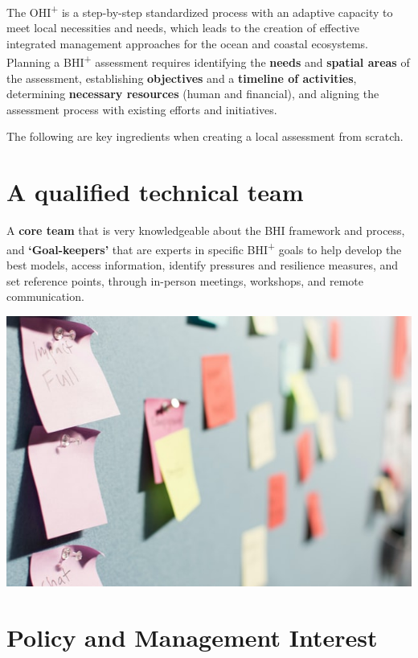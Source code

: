 \documentclass[
]{book}
\begin{document}
The OHI\textsuperscript{+} is a step-by-step standardized process with an adaptive capacity to meet local necessities and needs, which leads to the creation of effective integrated management approaches for the ocean and coastal ecosystems.
Planning a BHI\textsuperscript{+} assessment requires identifying the \textbf{needs} and \textbf{spatial areas} of the assessment, establishing \textbf{objectives} and a \textbf{timeline of activities}, determining \textbf{necessary resources} (human and financial), and aligning the assessment process with existing efforts and initiatives.

The following are key ingredients when creating a local assessment from scratch.

\hypertarget{a-qualified-technical-team}{%
\section{A qualified technical team}\label{a-qualified-technical-team}}

A \textbf{core team} that is very knowledgeable about the BHI framework and process, and \textbf{`Goal-keepers'} that are experts in specific BHI\textsuperscript{+} goals to help develop the best models, access information, identify pressures and resilience measures, and set reference points, through in-person meetings, workshops, and remote communication.

\begin{center}\includegraphics[width=800px]{_book/_main_files/figure-html/workshop-unsplash-photo-by-patrick-perkins} \end{center}

\hypertarget{policy-and-management-interest}{%
\section{Policy and Management Interest}\label{policy-and-management-interest}}
\end{document}
